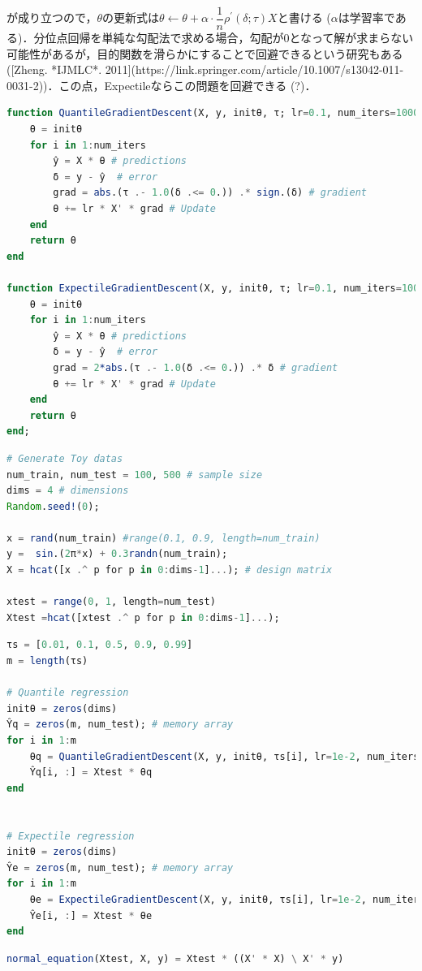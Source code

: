 が成り立つので，$\theta$の更新式は$\theta \leftarrow \theta + \alpha\cdot \dfrac{1}{n} \rho^{\prime}(\delta; \tau) X$と書ける ($\alpha$は学習率である)．分位点回帰を単純な勾配法で求める場合，勾配が0となって解が求まらない可能性があるが，目的関数を滑らかにすることで回避できるという研究もある ([Zheng. *IJMLC*. 2011](https://link.springer.com/article/10.1007/s13042-011-0031-2))．この点，Expectileならこの問題を回避できる (?)．
\begin{lstlisting}[language=julia]
function QuantileGradientDescent(X, y, initθ, τ; lr=0.1, num_iters=10000)
    θ = initθ
    for i in 1:num_iters
        ŷ = X * θ # predictions
        δ = y - ŷ  # error
        grad = abs.(τ .- 1.0(δ .<= 0.)) .* sign.(δ) # gradient
        θ += lr * X' * grad # Update
    end
    return θ
end

function ExpectileGradientDescent(X, y, initθ, τ; lr=0.1, num_iters=10000)
    θ = initθ
    for i in 1:num_iters
        ŷ = X * θ # predictions
        δ = y - ŷ  # error
        grad = 2*abs.(τ .- 1.0(δ .<= 0.)) .* δ # gradient
        θ += lr * X' * grad # Update
    end
    return θ
end;
\end{lstlisting}
\begin{lstlisting}[language=julia]
# Generate Toy datas
num_train, num_test = 100, 500 # sample size
dims = 4 # dimensions
Random.seed!(0);

x = rand(num_train) #range(0.1, 0.9, length=num_train)
y =  sin.(2π*x) + 0.3randn(num_train);
X = hcat([x .^ p for p in 0:dims-1]...); # design matrix

xtest = range(0, 1, length=num_test)
Xtest =hcat([xtest .^ p for p in 0:dims-1]...);
\end{lstlisting}
\begin{lstlisting}[language=julia]
τs = [0.01, 0.1, 0.5, 0.9, 0.99]
m = length(τs) 

# Quantile regression
initθ = zeros(dims)
Ŷq = zeros(m, num_test); # memory array
for i in 1:m
    θq = QuantileGradientDescent(X, y, initθ, τs[i], lr=1e-2, num_iters=1e5)
    Ŷq[i, :] = Xtest * θq
end


# Expectile regression
initθ = zeros(dims)
Ŷe = zeros(m, num_test); # memory array
for i in 1:m
    θe = ExpectileGradientDescent(X, y, initθ, τs[i], lr=1e-2, num_iters=1e5)
    Ŷe[i, :] = Xtest * θe
end
\end{lstlisting}
\begin{lstlisting}[language=julia]
normal_equation(Xtest, X, y) = Xtest * ((X' * X) \ X' * y)
\end{lstlisting}
